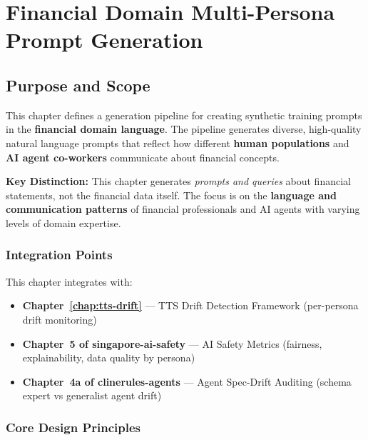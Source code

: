 
\chapter{Financial Domain Multi-Persona Prompt Generation}
\label{chap:financial-prompt-gen}

\section{Purpose and Scope}

This chapter defines a generation pipeline for creating synthetic training prompts
in the \textbf{financial domain language}. The pipeline generates diverse, high-quality
natural language prompts that reflect how different \textbf{human populations} and
\textbf{AI agent co-workers} communicate about financial concepts.

\begin{importantbox}
\textbf{Key Distinction:} This chapter generates \textit{prompts and queries} about
financial statements, not the financial data itself. The focus is on the \textbf{language
and communication patterns} of financial professionals and AI agents with varying
levels of domain expertise.
\end{importantbox}

\subsection{Integration Points}

This chapter integrates with:
\begin{itemize}
  \item \textbf{Chapter~\ref{chap:tts-drift}} --- TTS Drift Detection Framework
        (per-persona drift monitoring)
  \item \textbf{Chapter~5 of singapore-ai-safety} --- AI Safety Metrics (fairness,
        explainability, data quality by persona)
  \item \textbf{Chapter~4a of clinerules-agents} --- Agent Spec-Drift Auditing
        (schema expert vs generalist agent drift)
\end{itemize}

\subsection{Core Design Principles}

